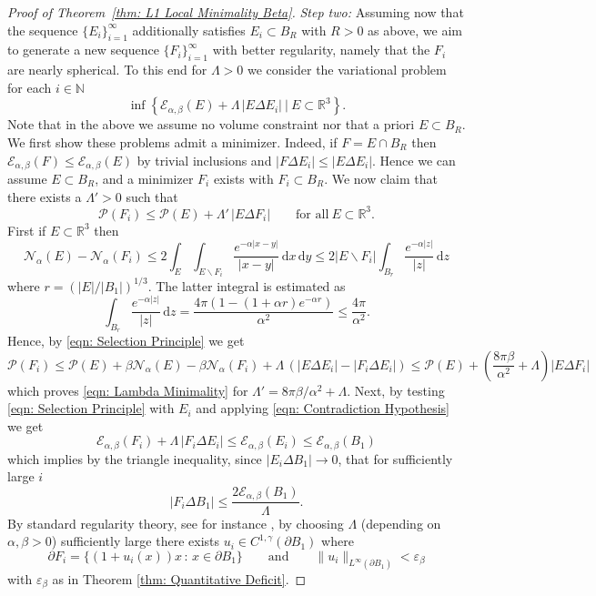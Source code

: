 \documentclass[a4paper,11pt,reqno]{amsart}
\numberwithin{equation}{section}
\theoremstyle{remark}
\theoremstyle{definition}
\let\epsilon\varepsilon
\newcommand{\dd}{\,\mathrm{d}}
\renewcommand{\setminus}{\backslash}
\newcommand{\ene}{\mathcal{E}_{\alpha,\beta}}
\newcommand{\nl}{\mathcal{N}_{\alpha}}
\renewcommand{\leq}{\leqslant}
\newcommand{\Pe}{\mathcal{P}}
\begin{document}
\begin{proof}[Proof of Theorem~\ref{thm: L1 Local Minimality Beta}]
\textit{Step two:} Assuming now that the sequence $\{E_i\}_{i=1}^{\infty}$ additionally satisfies $E_i \subset B_R$ with $R>0$ as above, we aim to generate a new sequence $\{F_i\}_{i=1}^{\infty}$ with better regularity, namely that the $F_i$ are nearly spherical. To this end for $\Lambda>0$ we consider the variational problem for each $i\in \mathbb{N}$
	\begin{equation}\label{eqn: Selection Principle}
		\inf\left\lbrace \ene(E)+\Lambda\,|E\Delta E_i| \ | \ E\subset \mathbb{R}^3 \right\rbrace.
	\end{equation}
Note that in the above we assume no volume constraint nor that a priori $E\subset B_R$. We first show these problems admit a minimizer. Indeed, if $F=E\cap B_R$ then $\ene(F) \leq \ene(E)$ by trivial inclusions and $|F\Delta E_i|\leq |E\Delta E_i|$. Hence we can assume $E\subset B_R$, and a minimizer $F_i$ exists with $F_i\subset B_R$. We now claim that there exists a $\Lambda'>0$ such that
	\begin{equation}\label{eqn: Lambda Minimality}
		\Pe(F_i) \leq \Pe(E) + \Lambda'\,|E\Delta F_i|  \qquad \text{for all} \ E\subset \mathbb{R}^3.
	\end{equation}
First if $E\subset \mathbb{R}^3$ then
	\begin{equation}\label{eqn: Nonlocal Lipschitz}
		\nl(E)-\nl(F_i) \leq 2\int_E\int_{E\setminus F_i} \frac{e^{-\alpha|x-y|}}{|x-y|} \dd x\dd y \leq 2|E\setminus F_i| \int_{B_r} \frac{e^{-\alpha|z|}}{|z|}\dd z
	\end{equation}
where $r =(|E|/|B_1|)^{1/3}$. The latter integral is estimated as 
	\[
		\int_{B_r} \frac{e^{-\alpha |z|}}{|z|} \dd z = \frac{4\pi(1-(1+\alpha r)e^{-\alpha r})}{\alpha^2} \leq \frac{4\pi}{\alpha^2}.
	\]
Hence, by \eqref{eqn: Selection Principle} we get
	\[
		\Pe(F_i) \leq \Pe(E)+\beta \nl(E)-\beta \nl(F_i) + \Lambda\, (|E\Delta E_i|-|F_i\Delta E_i|) \leq \Pe(E) + \left(\frac{8\pi\beta}{\alpha^2}+\Lambda\right) |E\Delta F_i|
	\]
which proves \eqref{eqn: Lambda Minimality} for $\Lambda' = 8\pi \beta/\alpha^2+\Lambda$. Next, by testing \eqref{eqn: Selection Principle} with $E_i$ and applying \eqref{eqn: Contradiction Hypothesis} we get
	\begin{equation}\label{eqn: Selection Principle Energy Estimate}
		\ene(F_i) + \Lambda\, |F_i\Delta E_i| \leq \ene(E_i) \leq \ene(B_1)
	\end{equation}
which implies by the triangle inequality, since $|E_i \Delta B_1|\to 0$, that for sufficiently large $i$
	\[
		|F_i\Delta B_1| \leq \frac{2\ene(B_1)}{\Lambda}.
	\]
By standard regularity theory, see for instance \cite[Theorem 26.6]{Mag}, by choosing $\Lambda$ (depending on $\alpha, \beta>0$) sufficiently large  there exists $u_i \in C^{1,\gamma}(\partial B_1)$ where
	\[
		\partial F_i = \Big\lbrace(1+u_i(x))x \, : \, x\in \partial B_1\Big\rbrace \qquad \text{and} \qquad \|u_i\|_{L^{\infty}(\partial B_1)} < \epsilon_{\beta}
	\]
with $\epsilon_{\beta}$ as in Theorem \ref{thm: Quantitative Deficit}.


\end{proof}
\end{document}
